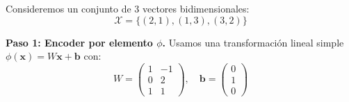 \begin{example}\label{ex:deepsets_numerical}
Consideremos un conjunto de 3 vectores bidimensionales:
\begin{equation}
\mathcal{X} = \{(2, 1), (1, 3), (3, 2)\}
\end{equation}

\textbf{Paso 1: Encoder por elemento $\phi$.} Usamos una transformación lineal simple $\phi(\mathbf{x}) = W\mathbf{x} + \mathbf{b}$ con:
\begin{equation}
W = \begin{pmatrix} 1 & -1 \\ 0 & 2 \\ 1 & 1 \end{pmatrix}, \quad \mathbf{b} = \begin{pmatrix} 0 \\ 1 \\ 0 \end{pmatrix}
\end{equation}


\end{example}
